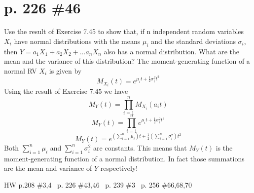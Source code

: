 \documentclass[12pt]{article}
\begin{document}
	\section[20pt]{p. 226 \#46}
	Use the result of Exercise 7.45 to show that, if n independent random variables \(X_i\) have normal distributions with the means \(\mu_i\) and the standard deviations \(\sigma_i\), then \(Y=a_1X_1+a_2X_2+...a_nX_n\) also has a normal distribution. What are the mean and the variance of this distribution? \newline \newline
	The moment-generating function of a normal RV \(X_i\) is given by
	\[M_{X_i}(t)=e^{\mu_i t+\frac{1}{2}\sigma_i^2t^2}\]
	Using the result of Exercise 7.45 we have
	\[M_Y(t)=\prod_{i=1}^nM_{X_i}(a_it)\]
	\[M_Y(t)=\prod_{i=1}^ne^{\mu_i t+\frac{1}{2}\sigma_i^2t^2}\]
	\[M_Y(t)=e^{(\sum_{i=1}^n\mu_i) t+\frac{1}{2}(\sum_{i=1}^n\sigma_i^2)t^2}\]
	Both \(\sum_{i=1}^n\mu_i\) and \(\sum_{i=1}^n\sigma_i^2\) are constants. \newline
	This means that \(M_Y(t)\) is the moment-generating function of a normal distribution.
	In fact those summations are the mean and variance of \(Y\) respectively! \newline \newline
	\newpage
	\maketitle HW p.208 \#3,4 \ p. 226 \#43,46 \ p. 239 \#3 \ p. 256 \#66,68,70
\end{document}
